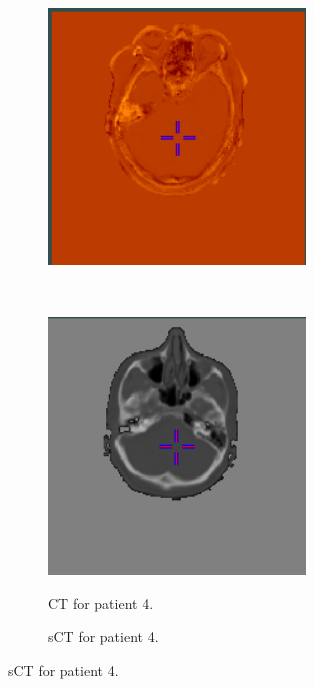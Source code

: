 \begin{figure}
\begin{subfigure}[b]{0.3\textwidth}
        \includegraphics[width=0.75\textwidth]{colager/loocv_ct/loocv_010850_sub.png}
        \label{col:loocv_ct_pat3_sub}
    \end{subfigure}\\
    \begin{subfigure}[b]{0.3\textwidth}
        \caption{CT for patient 4.}
        \includegraphics[width=0.75\textwidth]{colager/loocv_ct/loocv_010960_ct.png}
        \label{col:loocv_ct_pat4_ct}
    \end{subfigure}\hfill
    \begin{subfigure}[b]{0.3\textwidth}
        \caption{sCT for patient 4.}

\end{subfigure}
\end{figure}
